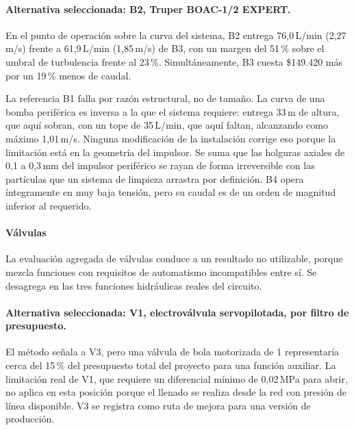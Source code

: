 

\paragraph{Alternativa seleccionada: B2, Truper BOAC-1/2 EXPERT.} En el punto de operación sobre la curva del sistema, B2 entrega 76,0\,L/min (2,27\,m/s) frente a 61,9\,L/min (1,85\,m/s) de B3, con un margen del 51\,\% sobre el umbral de turbulencia frente al 23\,\%. Simultáneamente, B3 cuesta \$149.420 más por un 19\,\% menos de caudal.

La referencia B1 falla por razón estructural, no de tamaño. La curva de una bomba periférica es inversa a la que el sistema requiere: entrega 33\,m de altura, que aquí sobran, con un tope de 35\,L/min, que aquí faltan, alcanzando como máximo 1,01\,m/s. Ninguna modificación de la instalación corrige eso porque la limitación está en la geometría del impulsor. Se suma que las holguras axiales de 0,1 a 0,3\,mm del impulsor periférico se rayan de forma irreversible con las partículas que un sistema de limpieza arrastra por definición. B4 opera íntegramente en muy baja tensión, pero su caudal es de un orden de magnitud inferior al requerido.

\paragraph{Válvulas}

La evaluación agregada de válvulas conduce a un resultado no utilizable, porque mezcla funciones con requisitos de automatismo incompatibles entre sí. Se desagrega en las tres funciones hidráulicas reales del circuito.



\paragraph{Alternativa seleccionada: V1, electroválvula servopilotada, por filtro de presupuesto.} El método señala a V3, pero una válvula de bola motorizada de 1\textquotedbl{} representaría cerca del 15\,\% del presupuesto total del proyecto para una función auxiliar. La limitación real de V1, que requiere un diferencial mínimo de 0,02\,MPa para abrir, no aplica en esta posición porque el llenado se realiza desde la red con presión de línea disponible. V3 se registra como ruta de mejora para una versión de producción.



